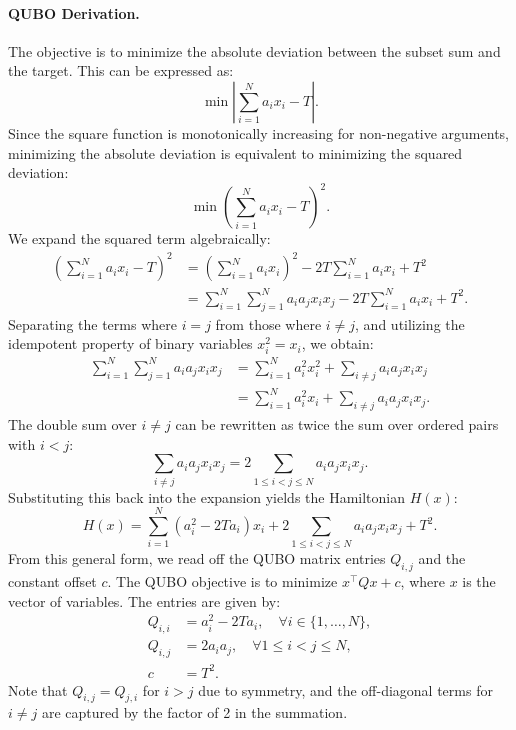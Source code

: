 \documentclass[12pt]{article}
\begin{document}
\paragraph{QUBO Derivation.}
The objective is to minimize the absolute deviation between the subset sum and the target. This can be expressed as:
\begin{equation}
    \min \left| \sum_{i=1}^N a_i x_i - T \right|.
\end{equation}
Since the square function is monotonically increasing for non-negative arguments, minimizing the absolute deviation is equivalent to minimizing the squared deviation:
\begin{equation}
    \min \left( \sum_{i=1}^N a_i x_i - T \right)^2.
\end{equation}
We expand the squared term algebraically:
\begin{align}
    \left( \sum_{i=1}^N a_i x_i - T \right)^2 &= \left( \sum_{i=1}^N a_i x_i \right)^2 - 2T \sum_{i=1}^N a_i x_i + T^2 \\
    &= \sum_{i=1}^N \sum_{j=1}^N a_i a_j x_i x_j - 2T \sum_{i=1}^N a_i x_i + T^2.
\end{align}
Separating the terms where $i = j$ from those where $i \neq j$, and utilizing the idempotent property of binary variables $x_i^2 = x_i$, we obtain:
\begin{align}
    \sum_{i=1}^N \sum_{j=1}^N a_i a_j x_i x_j &= \sum_{i=1}^N a_i^2 x_i^2 + \sum_{i \neq j} a_i a_j x_i x_j \\
    &= \sum_{i=1}^N a_i^2 x_i + \sum_{i \neq j} a_i a_j x_i x_j.
\end{align}
The double sum over $i \neq j$ can be rewritten as twice the sum over ordered pairs with $i < j$:
\begin{equation}
    \sum_{i \neq j} a_i a_j x_i x_j = 2 \sum_{1 \le i < j \le N} a_i a_j x_i x_j.
\end{equation}
Substituting this back into the expansion yields the Hamiltonian $H(x)$:
\begin{equation}
    H(x) = \sum_{i=1}^N (a_i^2 - 2T a_i) x_i + 2 \sum_{1 \le i < j \le N} a_i a_j x_i x_j + T^2.
\end{equation}
From this general form, we read off the QUBO matrix entries $Q_{i,j}$ and the constant offset $c$. The QUBO objective is to minimize $x^\top Q x + c$, where $x$ is the vector of variables. The entries are given by:
\begin{align}
    Q_{i,i} &= a_i^2 - 2T a_i, \quad \forall i \in \{1, \dots, N\}, \\
    Q_{i,j} &= 2 a_i a_j, \quad \forall 1 \le i < j \le N, \\
    c &= T^2.
\end{align}
Note that $Q_{i,j} = Q_{j,i}$ for $i > j$ due to symmetry, and the off-diagonal terms for $i \neq j$ are captured by the factor of 2 in the summation.
\end{document}
